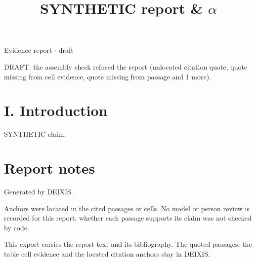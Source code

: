\documentclass[journal]{IEEEtran}
\begin{document}
\title{SYNTHETIC report \& \ensuremath{\alpha}}

\maketitle

\noindent Evidence report \ensuremath{\cdot} draft

\noindent DRAFT: the assembly check refused the report (unlocated citation quote, quote missing from cell evidence, quote missing from passage and 1 more).

\section*{I. Introduction}

SYNTHETIC claim. \cite{Synth26}

\section*{Report notes}

Generated by DEIXIS.

Anchors were located in the cited passages or cells. No model or person review is recorded for this report; whether each passage supports its claim was not checked by code.

This export carries the report text and its bibliography. The quoted passages, the table cell evidence and the located citation anchors stay in DEIXIS.




\end{document}
